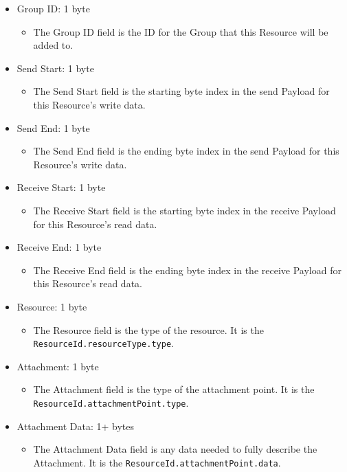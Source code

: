 \documentclass{article}
\begin{document}
\begin{itemize}
    \item Group ID: 1 byte
    \begin{itemize}
        \item The Group ID field is the ID for the Group that this Resource will be added to.
    \end{itemize}

    \item Send Start: 1 byte
    \begin{itemize}
        \item The Send Start field is the starting byte index in the send Payload for this
        Resource's write data.
    \end{itemize}

    \item Send End: 1 byte
    \begin{itemize}
        \item The Send End field is the ending byte index in the send Payload for this Resource's
        write data.
    \end{itemize}

    \item Receive Start: 1 byte
    \begin{itemize}
        \item The Receive Start field is the starting byte index in the receive Payload for this
        Resource's read data.
    \end{itemize}

    \item Receive End: 1 byte
    \begin{itemize}
        \item The Receive End field is the ending byte index in the receive Payload for this
        Resource's read data.
    \end{itemize}

    \item Resource: 1 byte
    \begin{itemize}
        \item The Resource field is the type of the resource. It is the \\
        \texttt{ResourceId.resourceType.type}.
    \end{itemize}

    \item Attachment: 1 byte
    \begin{itemize}
        \item The Attachment field is the type of the attachment point. It is the
        \texttt{ResourceId.attachmentPoint.type}.
    \end{itemize}

    \item Attachment Data: 1+ bytes
    \begin{itemize}
        \item The Attachment Data field is any data needed to fully describe the Attachment. It is
        the \texttt{ResourceId.attachmentPoint.data}.
    \end{itemize}
\end{itemize}
\end{document}
